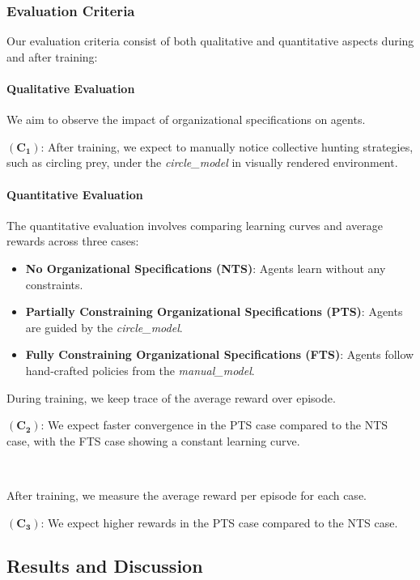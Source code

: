 \documentclass[runningheads]{llncs}
\theoremstyle{freethm}
\theoremstyle{proofoutline}
\begin{document}
\subsubsection{Evaluation Criteria}

Our evaluation criteria consist of both qualitative and quantitative aspects during and after training:

\paragraph{Qualitative Evaluation} We aim to observe the impact of organizational specifications on agents.

$(\mathbf{C_1})$: After training, we expect to manually notice collective hunting strategies, such as circling prey, under the \textit{circle\_model} in visually rendered environment.

\paragraph{Quantitative Evaluation} The quantitative evaluation involves comparing learning curves and average rewards across three cases:
\begin{itemize}
    \item \textbf{No Organizational Specifications (NTS)}: Agents learn without any constraints.
    \item \textbf{Partially Constraining Organizational Specifications (PTS)}: Agents are guided by the \textit{circle\_model}.
    \item \textbf{Fully Constraining Organizational Specifications (FTS)}: Agents follow hand-crafted policies from the \textit{manual\_model}.
\end{itemize}

\noindent During training, we keep trace of the average reward over episode.

$(\mathbf{C_2})$: We expect faster convergence in the PTS case compared to the NTS case, with the FTS case showing a constant learning curve.

\

\noindent After training, we measure the average reward per episode for each case.

$(\mathbf{C_3})$: We expect higher rewards in the PTS case compared to the NTS case.

\subsection{Results and Discussion}
\end{document}
